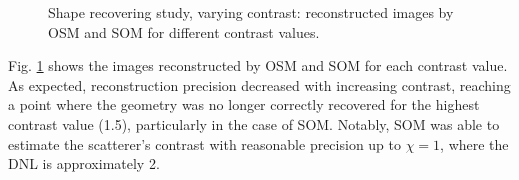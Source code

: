 \documentclass{IEEEtran}
\begin{document}
\begin{figure}[!htb]
                    \caption{Shape recovering study, varying contrast: reconstructed images by OSM and SOM for different contrast values.}
                    \label{fig:shape:vary:recons}
                \end{figure}
                

                Fig. \ref{fig:shape:vary:recons} shows the images reconstructed by OSM and SOM for each contrast value. As expected, reconstruction precision decreased with increasing contrast, reaching a point where the geometry was no longer correctly recovered for the highest contrast value (1.5), particularly in the case of SOM. Notably, SOM was able to estimate the scatterer's contrast with reasonable precision up to $\chi = 1$, where the DNL is approximately 2.
\end{document}
